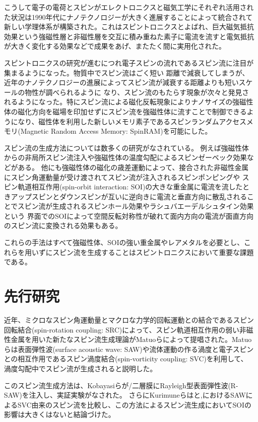 \documentclass[dvipdfmx]{jsreport}
\numberwithin{equation}{chapter}
\numberwithin{table}{chapter}
\begin{document}
こうして電子の電荷とスピンがエレクトロニクスと磁気工学にそれぞれ活用された状況は1990年代にナノテクノロジーが大きく進展することによって統合されて新しい学理体系が構築された。これはスピントロニクスとよばれ、巨大磁気抵抗効果という強磁性層と非磁性層を交互に積み重ねた素子に電流を流すと電気抵抗が大きく変化する効果などで成果をあげ、またたく間に実用化された。

スピントロニクスの研究が進むにつれ電子スピンの流れであるスピン流に注目が集まるようになった。物質中でスピン流はごく短い
距離で減衰してしまうが、近年のナノテクノロジーの進展によってスピン流が減衰する距離よりも短いスケールの物性が調べられるように
なり、スピン流のもたらす現象が次々と発見されるようになった。特にスピン流による磁化反転現象によりナノサイズの強磁性体の磁化方向を磁場を印加せずにスピン流を強磁性体に流すことで制御できるようになり、磁性体を利用した新しいメモリ素子であるスピンランダムアクセスメモリ(Magnetic Random Access Memory: SpinRAM)を可能にした。

スピン流の生成方法については数多くの研究がなされている。
例えば強磁性体からの非局所スピン流注入や強磁性体の温度勾配によるスピンゼーベック効果などがある。
他にも強磁性体の磁化の歳差運動によって、接合された非磁性金属にスピン角運動量が受け渡されてスピン流が注入されるスピンポンピングや
スピン軌道相互作用(spin-orbit interaction: SOI)の大きな重金属に電流を流したときアップスピンとダウンスピンが互いに逆向きに電流と垂直方向に散乱されることでスピン流が生成されるスピンホール効果やラシュバエーデルシュタイン効果という
界面でのSOIによって空間反転対称性が破れて面内方向の電流が面直方向のスピン流に変換される効果もある。

これらの手法はすべて強磁性体、SOIの強い重金属やレアメタルを必要とし、これらを用いずにスピン流を生成することはスピントロニクスにおいて重要な課題である。

\section{先行研究}
近年、ミクロなスピン角運動量とマクロな力学的回転運動との結合であるスピン回転結合(spin-rotation coupling: SRC)によって、スピン軌道相互作用の弱い非磁性金属を用いた新たなスピン流生成理論がMatuoらによって提唱された。Matuoらは表面弾性波(surface acoustic wave: SAW)や流体運動の作る渦度と電子スピンとの相互作用であるスピン渦度結合(spin-vorticity coupling: SVC)を利用して、渦度勾配中でスピン流が生成されると説明した。

このスピン流生成方法は、Kobayasiらが/二層膜にRayleigh型表面弾性波(R-SAW)を注入し、実証実験がなされた。
さらにKurimuneらはと,におけるSAWによるSVC由来のスピン流を比較し、この方法によるスピン流生成においてSOIの影響は大きくはないと結論づけた。
\end{document}

